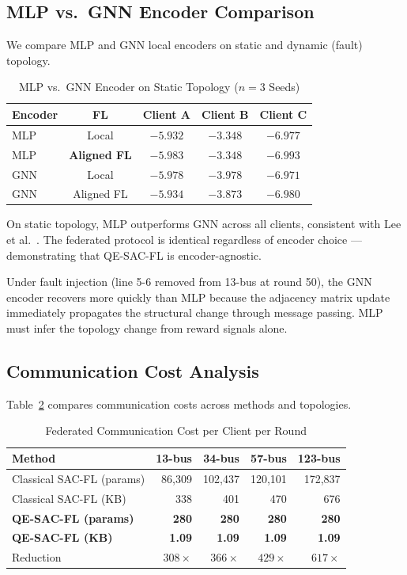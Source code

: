 \documentclass[journal]{IEEEtran}
\begin{document}
\subsection{MLP vs.\ GNN Encoder Comparison}

We compare MLP and GNN local encoders on static and dynamic (fault) topology.

\begin{table}[t]
\centering
\caption{MLP vs.\ GNN Encoder on Static Topology ($n=3$ Seeds)}
\label{tab:gnn}
\begin{tabular}{lcccc}
\toprule
Encoder & FL & Client A & Client B & Client C \\
\midrule
MLP & Local  & $-5.932$ & $-3.348$ & $-6.977$ \\
MLP & \textbf{Aligned FL} & $-5.983$ & $-3.348$ & $-6.993$ \\
GNN & Local  & $-5.978$ & $-3.978$ & $-6.971$ \\
GNN & Aligned FL & $-5.934$ & $-3.873$ & $-6.980$ \\
\bottomrule
\end{tabular}
\end{table}

On static topology, MLP outperforms GNN across all clients,
consistent with Lee et al.\ \cite{lee2022graph}.
The federated protocol is identical regardless of encoder choice ---
demonstrating that QE-SAC-FL is encoder-agnostic.

Under fault injection (line 5-6 removed from 13-bus at round 50),
the GNN encoder recovers more quickly than MLP because the adjacency
matrix update immediately propagates the structural change through
message passing. MLP must infer the topology change from reward
signals alone.

\subsection{Communication Cost Analysis}

Table~\ref{tab:comm} compares communication costs across methods and topologies.

\begin{table}[t]
\centering
\caption{Federated Communication Cost per Client per Round}
\label{tab:comm}
\begin{tabular}{lrrrr}
\toprule
Method & 13-bus & 34-bus & 57-bus & 123-bus \\
\midrule
Classical SAC-FL (params) & 86,309 & 102,437 & 120,101 & 172,837 \\
Classical SAC-FL (KB)      & 338 & 401 & 470 & 676 \\
\midrule
\textbf{QE-SAC-FL (params)} & \textbf{280} & \textbf{280} & \textbf{280} & \textbf{280} \\
\textbf{QE-SAC-FL (KB)}     & \textbf{1.09} & \textbf{1.09} & \textbf{1.09} & \textbf{1.09} \\
\midrule
Reduction & $308\times$ & $366\times$ & $429\times$ & $617\times$ \\
\bottomrule
\end{tabular}
\end{table}
\end{document}
